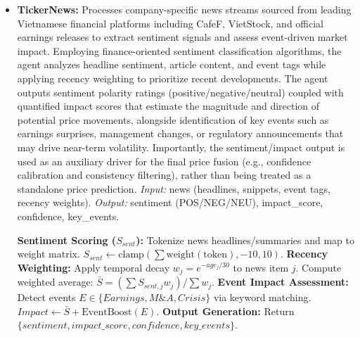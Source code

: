 \documentclass{ieeeaccess}
\begin{document}
\begin{itemize}
    \item \textbf{TickerNews:} 
    Processes company-specific news streams sourced from leading Vietnamese financial platforms including CafeF, VietStock, and official earnings releases to extract sentiment signals and assess event-driven market impact. Employing finance-oriented sentiment classification algorithms, the agent analyzes headline sentiment, article content, and event tags while applying recency weighting to prioritize recent developments. The agent outputs sentiment polarity ratings (positive/negative/neutral) coupled with quantified impact scores that estimate the magnitude and direction of potential price movements, alongside identification of key events such as earnings surprises, management changes, or regulatory announcements that may drive near-term volatility.  
    Importantly, the sentiment/impact output is used as an auxiliary driver for the final price fusion (e.g., confidence calibration and consistency filtering), rather than being treated as a standalone price prediction.
    \textit{Input:} news (headlines, snippets, event tags, recency weights).  
    \textit{Output:} sentiment (POS/NEG/NEU), impact\_score, confidence, key\_events.

    \begin{algorithm}[H]
    \caption{TickerNews sentiment and event analysis}
    \begin{algorithmic}[1]
    \STATE \textbf{Sentiment Scoring ($S_{sent}$):}
    \STATE \quad Tokenize news headlines/summaries and map to weight matrix.
    \STATE \quad $S_{sent} \gets \text{clamp}(\sum \text{weight}(\text{token}), -10, 10)$.
    \STATE \textbf{Recency Weighting:}
    \STATE \quad Apply temporal decay $w_j = e^{-age_j/30}$ to news item $j$.
    \STATE \quad Compute weighted average: $\bar{S} = (\sum S_{sent,j} w_j) / \sum w_j$.
    \STATE \textbf{Event Impact Assessment:}
    \STATE \quad Detect events $E \in \{Earnings, M\&A, Crisis\}$ via keyword matching.
    \STATE \quad $Impact \gets \bar{S} + \text{EventBoost}(E)$.
    \STATE \textbf{Output Generation:}
    \STATE \quad Return $\{sentiment, impact\_score, confidence, key\_events\}$.
    \end{algorithmic}
    \end{algorithm}


\end{itemize}
\end{document}
